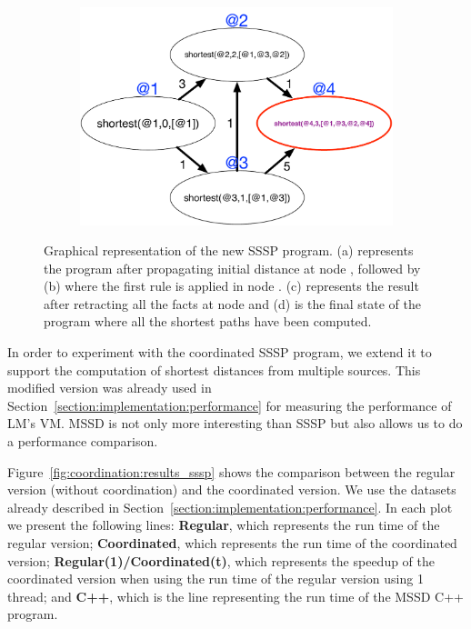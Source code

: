 \begin{figure}
\begin{center}
\begin{subfigure}[b]{0.4\textwidth}
      \caption{}
   \end{subfigure}
   \begin{subfigure}[b]{0.4\textwidth}
      \includegraphics[width=\textwidth]{figures/sssp/coord4}
      \caption{}
   \end{subfigure}
\end{center}
\caption{Graphical representation of the new SSSP program. (a) represents the
   program after propagating initial distance at node , followed by
   (b) where the first rule is applied in node . (c)
   represents the result after retracting all the  facts at node
    and (d) is the final state of the program where all the shortest paths
   have been computed.}
\label{fig:coordination:new_sssp}
\end{figure}

In order to experiment with the coordinated SSSP program, we extend it to
support the computation of shortest distances from multiple sources. This
modified version was already used in
Section~\ref{section:implementation:performance} for measuring the performance
of LM's VM. MSSD is not only more interesting than SSSP but also allows us to do
a performance comparison.

Figure~\ref{fig:coordination:results_sssp} shows the comparison between the
regular version (without coordination) and the coordinated version. We use the
datasets already described in Section~\ref{section:implementation:performance}.
In each plot we present the following lines: \textbf{Regular}, which represents
the run time of the regular version; \textbf{Coordinated}, which represents the
run time of the coordinated version; \textbf{Regular(1)/Coordinated(t)}, which
represents the speedup of the coordinated version when using the run time of the
regular version using 1 thread; and \textbf{C++}, which is the line representing
the run time of the MSSD C++ program.

